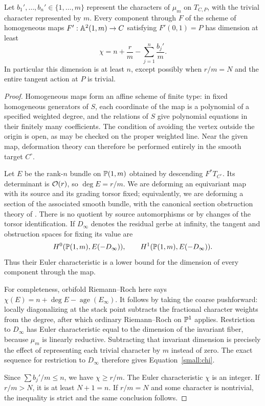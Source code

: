 \begin{lemma}
\label{small:deformation}
Let \(b_1',\ldots,b_n'\in\{1,\ldots,m\}\) represent the characters of
\(\mu_m\) on \(T_{C,P}\), with the trivial character represented by
\(m\).  Every component through \(F\) of the scheme of homogeneous maps
\(F':\mathbb A^2(1,m)\to C\) satisfying \(F'(0,1)=P\) has dimension at least
\begin{equation}
 \chi=n+\frac rm-\sum_{j=1}^n\frac{b_j'}m.
 \label{small:chi}
\end{equation}
In particular this dimension is at least \(n\), except possibly when
\(r/m=N\) and the entire tangent action at \(P\) is trivial.
\end{lemma}

\begin{proof}
Homogeneous maps form an affine scheme of finite type: in fixed
homogeneous generators of \(S\), each coordinate of the map is a
polynomial of a specified weighted degree, and the relations of \(S\)
give polynomial equations in their finitely many coefficients.  The
condition of avoiding the vertex outside the origin is open, as may be
checked on the proper weighted line.  Near the given map, deformation
theory can therefore be performed entirely in the smooth target
\(C^\circ\).

Let \(E\) be the rank-\(n\) bundle on \(\mathbb P(1,m)\) obtained by
descending \(F^*T_{C^\circ}\).  Its determinant is \(\mathcal O(r)\), so
\(\deg E=r/m\).  We are deforming an equivariant map with its source
and its grading torsor fixed; equivalently, we are deforming a section
of the associated smooth bundle, with the canonical section obstruction
theory of \cite[Theorem~4.13 and Equation~(4.18)]{Webb22}.
There is no quotient by source
automorphisms or by changes of the torsor identification.  If
\(D_\infty\) denotes the residual gerbe at infinity, the tangent and
obstruction spaces for fixing its value are
\[
 H^0(\mathbb P(1,m),E(-D_\infty)),\qquad
 H^1(\mathbb P(1,m),E(-D_\infty)).
\]
Thus their Euler characteristic is a lower bound for the dimension of
every component through the map.

For completeness, orbifold Riemann--Roch here says
\(\chi(E)=n+\deg E-\operatorname{age}(E_\infty)\).
It follows by taking the coarse pushforward: locally diagonalizing at
the stack point subtracts the fractional character weights from the
degree, after which ordinary Riemann--Roch on \(\mathbb P^1\) applies.
Restriction to \(D_\infty\) has Euler characteristic equal to the
dimension of the invariant fiber, because \(\mu_m\) is linearly
reductive.  Subtracting that invariant dimension is precisely the
effect of representing each trivial character by \(m\) instead of
zero.  The exact sequence for restriction to \(D_\infty\) therefore
gives Equation~\eqref{small:chi}.

Since \(\sum b_j'/m\leq n\), we have \(\chi\geq r/m\).  The Euler
characteristic \(\chi\) is an integer.  If \(r/m>N\), it is at least
\(N+1=n\).  If \(r/m=N\)
and some character is nontrivial, the inequality is strict and the
same conclusion follows.
\end{proof}

